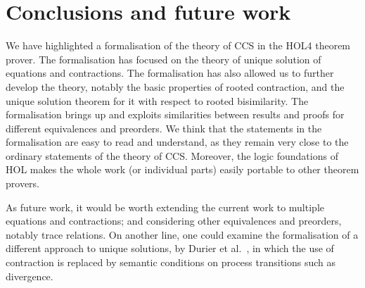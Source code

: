 


\section{Conclusions and future work}
\label{s:concl}

We have highlighted a formalisation of the theory of CCS in the 
HOL4 theorem prover. The formalisation has focused on the theory of
unique solution of equations and contractions. 
The formalisation has also allowed us to further develop the theory,
notably the basic properties of rooted contraction, and the unique
solution theorem for it with respect to rooted bisimilarity. 
The formalisation brings up and exploits similarities between results
and proofs for different equivalences and preorders. 
We think that the statements in the formalisation are easy to read and
understand, as they remain very close  to  the ordinary  statements of
the theory of CCS. 
Moreover, 
the logic foundations of HOL makes the whole work (or individual
parts) easily portable to other theorem provers.


As future work,  it would be worth extending the current work
to multiple equations and contractions; and considering other equivalences
and preorders, notably trace relations.  
On another line, one could  
examine the formalisation of  a different approach to unique
solutions, by Durier et al.\ \cite{DurierHS17}, in which the use of contraction is
replaced by semantic conditions on process transitions such as
divergence.  




